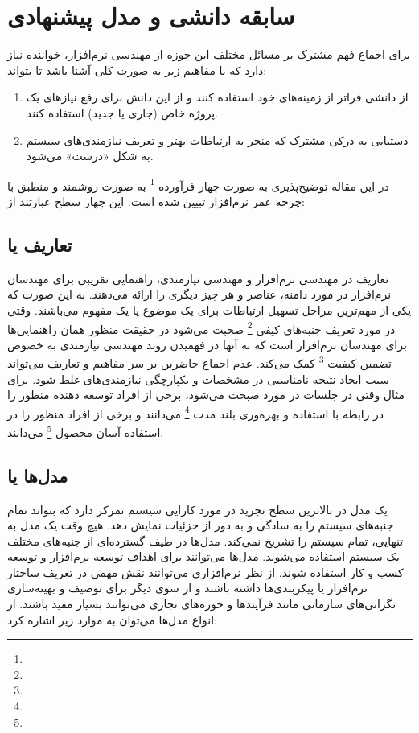 \section{سابقه دانشی و مدل پیشنهادی}

برای اجماع فهم مشترک بر مسائل مختلف این حوزه از مهندسی نرم‌افزار، خواننده نیاز
دارد که با مفاهیم زیر به صورت کلی آشنا باشد تا بتواند:

\begin{enumerate}
    \item از دانشی فراتر از زمینه‌های خود استفاده کنند و از این دانش برای رفع
    نیاز‌های یک پروژه خاص (جاری یا جدید) استفاده کنند.
    \item دستیابی به درکی مشترک که منجر به ارتباطات بهتر و تعریف نیازمندی‌های
    سیستم به شکل «درست» می‌شود.
\end{enumerate}

در این مقاله توضیح‌پذیری به صورت چهار فرآورده \footnote{} به صورت
روشمند و منطبق با چرخه عمر نرم‌افزار تبیین شده است. این چهار سطح عبارتند از: 

\subsection{تعاریف یا }

تعاریف در مهندسی نرم‌افزار و مهندسی نیازمندی، راهنمایی تقریبی برای مهندسان
نرم‌افزار در مورد دامنه، عناصر و هر چیز دیگری را ارائه می‌دهند. به این صورت که
یکی از مهم‌ترین مراحل تسهیل ارتباطات برای یک موضوع یا یک مفهوم می‌باشند. وقتی در
مورد تعریف جنبه‌های کیفی \footnote{} صحبت می‌شود در حقیقت
منظور همان راهنمایی‌ها برای مهندسان نرم‌افزار است که به آنها در فهمیدن روند
مهندسی نیازمندی به خصوص تضمین کیفیت \footnote{} کمک
می‌کند. عدم اجماع حاضرین بر سر مفاهیم و تعاریف می‌تواند سبب ایجاد نتیجه نامناسبی
در مشخصات و یکپارچگی نیازمندی‌های غلط شود. برای مثال وقتی در جلسات در مورد
 صبحت می‌شود، برخی از افراد توسعه دهنده منظور را در رابطه با
استفاده و بهره‌وری بلند مدت \footnote{} می‌دانند و برخی
از افراد منظور را در استفاده آسان محصول \footnote{}
می‌دانند.

\subsection{مدل‌ها یا }

یک مدل در بالاترین سطح تجرید در مورد کارایی سیستم تمرکز دارد که بتواند تمام
جنبه‌های سیستم را به سادگی و به دور از جزئیات نمایش دهد. هیچ وقت یک مدل به
تنهایی، تمام سیستم را تشریح نمی‌کند. مدل‌ها در طیف گسترده‌ای از جنبه‌های مختلف
یک سیستم استفاده می‌شوند. مدل‌ها می‌توانند برای اهداف توسعه نرم‌افزار و توسعه
کسب و کار استفاده شوند. از نظر نرم‌افزاری می‌توانند نقش مهمی در تعریف ساختار
نرم‌افزار یا پیکربندی‌ها داشته باشند و از سوی دیگر برای توصیف و بهینه‌سازی
نگرانی‌های سازمانی مانند فرآیندها و حوزه‌های تجاری می‌توانند بسیار مفید باشند.
از انواع مدل‌ها می‌توان به موارد زیر اشاره کرد:

